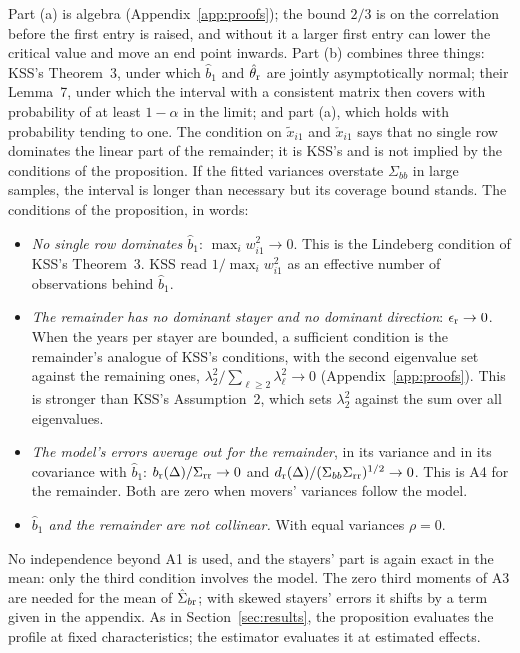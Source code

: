 Part (a) is algebra (Appendix~\ref{app:proofs}); the bound $2/3$ is on the correlation before the first entry is
raised, and without it a larger first entry can lower the critical value and move an end point inwards. Part (b)
combines three things: KSS's Theorem~3, under which $\hat b_1$ and $\hat\theta_{\rm r}$ are jointly asymptotically
normal; their Lemma~7, under which the interval with a consistent matrix then covers with probability of at
least $1-\alpha$ in the limit; and part (a), which holds with probability tending to one. The condition on
$\tilde x_{i1}$ and $\check x_{i1}$ says that no single row dominates the linear part of the remainder; it is
KSS's and is not implied by the conditions of the proposition. If the fitted variances overstate $\Sigma_{bb}$ in
large samples, the interval is longer than necessary but its coverage bound stands. The conditions of the
proposition, in words:
\begin{itemize}
\item \emph{No single row dominates $\hat b_1$}: $\max_iw_{i1}^2\to0$. This is the Lindeberg condition of KSS's
Theorem~3. KSS read $1/\max_iw_{i1}^2$ as an effective number of observations behind $\hat b_1$.
\item \emph{The remainder has no dominant stayer and no dominant direction}: $\epsilon_{\rm r}\to0$. When the
years per stayer are bounded, a sufficient condition is the remainder's analogue of KSS's conditions, with the
second eigenvalue set against the remaining ones, $\lambda_2^2/\sum_{\ell\ge2}\lambda_\ell^2\to0$
(Appendix~\ref{app:proofs}). This is stronger than KSS's Assumption~2, which sets $\lambda_2^2$ against the sum
over all eigenvalues.
\item \emph{The model's errors average out for the remainder}, in its variance and in its covariance with
$\hat b_1$: $b_{\rm r}(\Delta)/\Sigma_{\rm rr}\to0$ and $d_{\rm r}(\Delta)/(\Sigma_{bb}\Sigma_{\rm rr})^{1/2}\to0$. This is
A4 for the remainder. Both are zero when movers' variances follow the model.
\item \emph{$\hat b_1$ and the remainder are not collinear.} With equal variances $\rho=0$.
\end{itemize}
No independence beyond A1 is used, and the stayers' part is again exact in the mean: only the third condition
involves the model. The zero third moments of A3 are needed for the mean of $\hat\Sigma_{b{\rm r}}$; with
skewed stayers' errors it shifts by a term given in the appendix. As in Section~\ref{sec:results}, the
proposition evaluates the profile at fixed characteristics; the estimator evaluates it at estimated effects.

